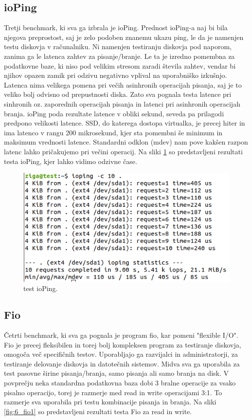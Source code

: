 \subsection{ioPing}
Tretji benchmark, ki sva ga izbrala je ioPing. Prednost ioPing-a naj bi bila njegova preprostost, saj je zelo podoben znanemu ukazu ping, le da je namenjen testu diskovja v računalniku. Ni namenjen testiranju diskovja pod naporom, zanima ga le latenca zahtev za pisanje/branje. Le ta je izredno pomembna za podatkovne baze, ki niso pod velikim stresom zaradi števila zahtev, vendar bi njihov opazen zamik pri odzivu negativno vplival na uporabniško izkušnjo. Latenca nima velikega pomena pri večih asinhronih operacijah pisanja, saj je to veliko bolj odvisno od prepustnosti diska. Zato sva pognala testa latence pri sinhronih oz. zaporednih operacijah pisanja in latenci pri asinhronih operacijah branja. ioPing poda rezultate latence v obliki sekund, seveda pa prilagodi predpono velikosti latence. SSD, do katerega dostopa virtualka, je precej hiter in ima latenco v rangu 200 mikrosekund, kjer sta pomembni še minimum in maksimum vrednosti latence. Standardni odklon (mdev) nam pove kakšen razpon latenc lahko pričakujemo pri večini operacij. Na sliki \ref{fig:5_ioping1} so predstavljeni rezultati testa ioPing, kjer lahko vidimo odzivne čase.
\begin{figure}[H]
    \centering
    \includegraphics[scale=0.5]{Img/ioping1.png}
    \caption{test ioPing.}
    \label{fig:5_ioping1}
\end{figure}

\subsection{Fio}
Četrti benchmark, ki sva ga pognala je program fio, kar pomeni "flexible I/O". Fio je precej fleksibilen in torej bolj kompleksen program za testiranje diskovja, omogoča več specifičnih testov. Uporabljajo ga razvijalci in administratorji, za testiranje delovanje diskovja in datotečnih sistemov. Midva sva ga uporabila za test pasovne širine pisanja/branja, samo pisanja ali samo branja na disk. V povprečju neka standardna podatkovna baza dobi 3 bralne operacije za vsako pisalno operacijo, torej je razmerje med read in write operacijami 3:1. To razmerje sva uporabila pri testu kombinacije pisanja in branja. Na sliki \ref{fig:6_fio1} so predstavljeni rezultati testa Fio za read in write.


